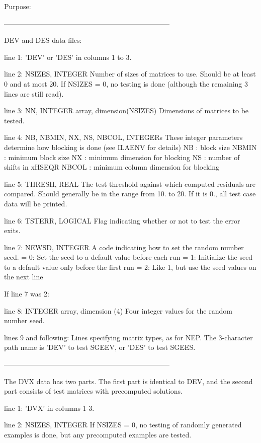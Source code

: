 \begin{DoxyParagraph}{Purpose\+: }
\begin{DoxyVerb}
-----------------------------------------------------------------------

 DEV and DES data files:

 line 1:  'DEV' or 'DES' in columns 1 to 3.

 line 2:  NSIZES, INTEGER
          Number of sizes of matrices to use. Should be at least 0
          and at most 20. If NSIZES = 0, no testing is done
          (although the remaining  3 lines are still read).

 line 3:  NN, INTEGER array, dimension(NSIZES)
          Dimensions of matrices to be tested.

 line 4:  NB, NBMIN, NX, NS, NBCOL, INTEGERs
          These integer parameters determine how blocking is done
          (see ILAENV for details)
          NB     : block size
          NBMIN  : minimum block size
          NX     : minimum dimension for blocking
          NS     : number of shifts in xHSEQR
          NBCOL  : minimum column dimension for blocking

 line 5:  THRESH, REAL
          The test threshold against which computed residuals are
          compared. Should generally be in the range from 10. to 20.
          If it is 0., all test case data will be printed.

 line 6:  TSTERR, LOGICAL
          Flag indicating whether or not to test the error exits.

 line 7:  NEWSD, INTEGER
          A code indicating how to set the random number seed.
          = 0:  Set the seed to a default value before each run
          = 1:  Initialize the seed to a default value only before the
                first run
          = 2:  Like 1, but use the seed values on the next line

 If line 7 was 2:

 line 8:  INTEGER array, dimension (4)
          Four integer values for the random number seed.

 lines 9 and following:  Lines specifying matrix types, as for NEP.
          The 3-character path name is 'DEV' to test SGEEV, or
          'DES' to test SGEES.

-----------------------------------------------------------------------

 The DVX data has two parts. The first part is identical to DEV,
 and the second part consists of test matrices with precomputed
 solutions.

 line 1:  'DVX' in columns 1-3.

 line 2:  NSIZES, INTEGER
          If NSIZES = 0, no testing of randomly generated examples
          is done, but any precomputed examples are tested.


\end{DoxyVerb}
\end{DoxyParagraph}
